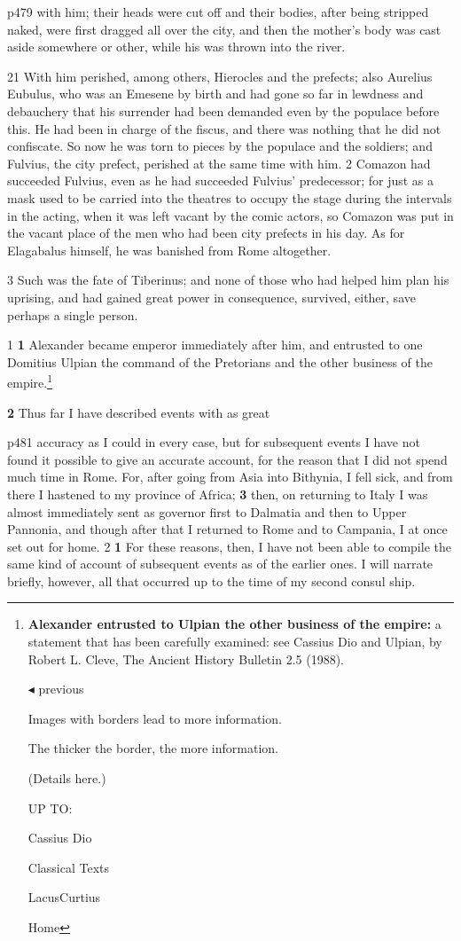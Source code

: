 p479 with him; their heads were cut off and their bodies, after being stripped naked, were first dragged all over the city, and then the mother's body was cast aside somewhere or other, while his was thrown into the river.

21
With him perished, among others, Hierocles and the prefects; also Aurelius Eubulus, who was an Emesene by birth and had gone so far in lewdness and debauchery that his surrender had been demanded even by the populace before this. He had been in charge of the fiscus, and there was nothing that he did not confiscate. So now he was torn to pieces by the populace and the soldiers; and Fulvius, the city prefect, perished at the same time with him. 2 Comazon had succeeded Fulvius, even as he had succeeded Fulvius' predecessor; for just as a mask used to be carried into the theatres to occupy the stage during the intervals in the acting, when it was left vacant by the comic actors, so Comazon was put in the vacant place of the men who had been city prefects in his day. As for Elagabalus himself, he was banished from Rome altogether.

3
Such was the fate of Tiberinus; and none of those who had helped him plan his uprising, and had gained great power in consequence, survived, either, save perhaps a single person.

1 \textbf{1} Alexander became emperor immediately after him, and entrusted to one Domitius Ulpian the command of the Pretorians and the other business of the empire.\texthebrew{⁠}\footnote{\textbf{Alexander entrusted to Ulpian the other business of the empire:}
a statement that has been carefully examined: see Cassius Dio and Ulpian, by Robert L. Cleve, The Ancient History Bulletin 2.5 (1988).

\texthebrew{◂} previous

Images with borders lead to more information.

The thicker the border, the more information.

(Details here.)

UP TO:

Cassius Dio

Classical Texts

LacusCurtius

Home}

\textbf{2}
Thus far I have described events with as great

p481 accuracy as I could in every case, but for subsequent events I have not found it possible to give an accurate account, for the reason that I did not spend much time in Rome. For, after going from Asia into Bithynia, I fell sick, and from there I hastened to my province of Africa; \textbf{3} then, on returning to Italy I was almost immediately sent as governor first to Dalmatia and then to Upper Pannonia, and though after that I returned to Rome and to Campania, I at once set out for home. 2 \textbf{1} For these reasons, then, I have not been able to compile the same kind of account of subsequent events as of the earlier ones. I will narrate briefly, however, all that occurred up to the time of my second consul ­ship.

